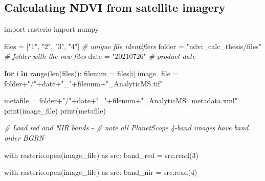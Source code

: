 \documentclass[12pt,twoside]{reedthesis}
\newenvironment{Shaded}{\begin{snugshade}}{\end{snugshade}}
\newcommand{\CommentTok}[1]{\textcolor[rgb]{0.56,0.35,0.01}{\textit{#1}}}
\newcommand{\ControlFlowTok}[1]{\textcolor[rgb]{0.13,0.29,0.53}{\textbf{#1}}}
\newcommand{\DecValTok}[1]{\textcolor[rgb]{0.00,0.00,0.81}{#1}}
\newcommand{\FunctionTok}[1]{\textcolor[rgb]{0.00,0.00,0.00}{#1}}
\newcommand{\NormalTok}[1]{#1}
\newcommand{\OtherTok}[1]{\textcolor[rgb]{0.56,0.35,0.01}{#1}}
\newcommand{\SpecialCharTok}[1]{\textcolor[rgb]{0.00,0.00,0.00}{#1}}
\newcommand{\StringTok}[1]{\textcolor[rgb]{0.31,0.60,0.02}{#1}}
\begin{document}
\hypertarget{calculating-ndvi-from-satellite-imagery}{%
\subsection*{Calculating NDVI from satellite imagery}\label{calculating-ndvi-from-satellite-imagery}}

\footnotesize
\begin{Shaded}
\begin{Highlighting}[]
\NormalTok{import rasterio}
\NormalTok{import numpy}

\NormalTok{files }\OtherTok{=}\NormalTok{ [}\StringTok{"1"}\NormalTok{, }\StringTok{"2"}\NormalTok{, }\StringTok{"3"}\NormalTok{, }\StringTok{"4"}\NormalTok{] }\CommentTok{\# unique file identifiers}
\NormalTok{folder }\OtherTok{=} \StringTok{"ndvi\_calc\_thesis/files"} \CommentTok{\# folder with the raw files}
\NormalTok{date }\OtherTok{=} \StringTok{"20210726"} \CommentTok{\# product date}


\ControlFlowTok{for}\NormalTok{ i }\ControlFlowTok{in} \FunctionTok{range}\NormalTok{(}\FunctionTok{len}\NormalTok{(files))}\SpecialCharTok{:}
\NormalTok{    filenum }\OtherTok{=}\NormalTok{ files[i]}
\NormalTok{    image\_file }\OtherTok{=}\NormalTok{ folder}\SpecialCharTok{+}\StringTok{"/"}\SpecialCharTok{+}\NormalTok{date}\SpecialCharTok{+}\StringTok{"\_"}\SpecialCharTok{+}\NormalTok{filenum}\SpecialCharTok{+}\StringTok{"\_AnalyticMS.tif"}

\NormalTok{    metafile }\OtherTok{=}\NormalTok{ folder}\SpecialCharTok{+}\StringTok{"/"}\SpecialCharTok{+}\NormalTok{date}\SpecialCharTok{+}\StringTok{"\_"}\SpecialCharTok{+}\NormalTok{filenum}\SpecialCharTok{+}\StringTok{"\_AnalyticMS\_metadata.xml"}
    \FunctionTok{print}\NormalTok{(image\_file)}
    \FunctionTok{print}\NormalTok{(metafile)}

    \CommentTok{\# Load red and NIR bands {-} }
    \CommentTok{\# note all PlanetScope 4{-}band images have band order BGRN}

\NormalTok{    with }\FunctionTok{rasterio.open}\NormalTok{(image\_file) as src}\SpecialCharTok{:}
\NormalTok{        band\_red }\OtherTok{=} \FunctionTok{src.read}\NormalTok{(}\DecValTok{3}\NormalTok{)}

\NormalTok{    with }\FunctionTok{rasterio.open}\NormalTok{(image\_file) as src}\SpecialCharTok{:}
\NormalTok{        band\_nir }\OtherTok{=} \FunctionTok{src.read}\NormalTok{(}\DecValTok{4}\NormalTok{)}


\end{Highlighting}
\end{Shaded}
\end{document}
